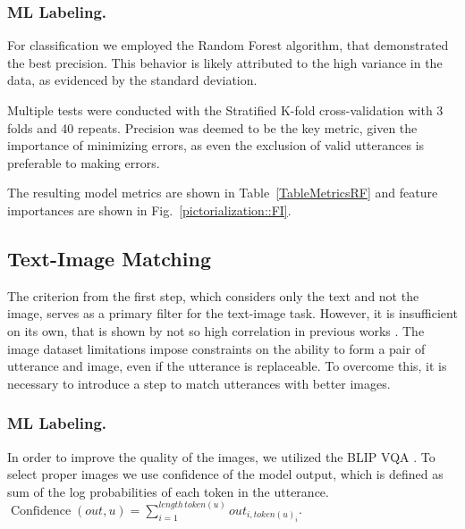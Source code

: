 \smallskip




\subsubsection{ML Labeling.}

For classification we employed the Random Forest algorithm, that demonstrated the best precision\cite{scikit-learn}. This behavior is likely attributed to the high variance in the data, as evidenced by the standard deviation.

Multiple tests were conducted with the Stratified K-fold cross-validation with 3 folds and 40 repeats. Precision was deemed to be the key metric, given the importance of minimizing errors, as even the exclusion of valid utterances is preferable to making errors.

\smallskip

The resulting model metrics are shown in Table~\ref{TableMetricsRF} and feature importances are shown in Fig.~\ref{pictorialization::FI}. 



\subsection{Text-Image Matching}

The criterion from the first step, which considers only the text and not the image, serves as a primary filter for the text-image task. However, it is insufficient on its own, that is shown by not so high correlation in previous works \cite{Lee-2021}. The image dataset limitations impose constraints on the ability to form a pair of utterance and image, even if the utterance is replaceable. To overcome this, it is necessary to introduce a step to match utterances with better images.

\subsubsection{ML Labeling.}

In order to improve the quality of the images, we utilized the BLIP VQA \cite{li2022blip}. To select proper images we use confidence of the model output, which is defined as sum of the log probabilities of each token in the utterance. $\operatorname{Confidence}(out, u) = \sum\limits_{i=1}^{length \, token(u)} out_{i, token(u)_i}$.

